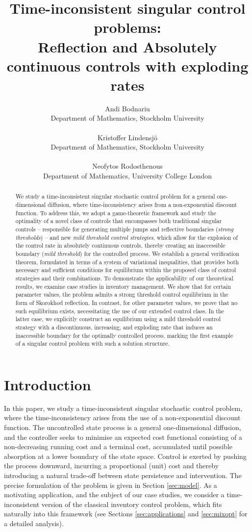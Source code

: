 \documentclass[11pt]{article} %
\title{Time-inconsistent singular control problems: \\ Reflection and Absolutely continuous controls with exploding rates}
\author{
Andi Bodnariu \\Department of Mathematics, Stockholm University\\
\\Kristoffer Lindensjö\\Department of Mathematics, Stockholm University\\
\\Neofytos Rodosthenous\\Department of Mathematics, University College London
}
\numberwithin{komcounter}{section}
\begin{document}
\maketitle

\begin{abstract}
We study a time-inconsistent singular stochastic control problem for a general one-dimensional diffusion, where time-inconsistency arises from a non-exponential discount function. To address this, we adopt a game-theoretic framework and study the optimality of a novel class of controls that encompasses both traditional singular controls -- responsible for generating multiple jumps and reflective boundaries ({\it strong thresholds}) -- and new {\it mild threshold control strategies}, which allow for the explosion of the control rate in absolutely continuous controls, thereby creating an inaccessible boundary ({\it mild threshold}) for the controlled process. 
We establish a general verification theorem, formulated in terms of a system of variational inequalities, that provides both necessary and sufficient conditions for equilibrium within the proposed class of control strategies and their combinations. To demonstrate the applicability of our theoretical results, we examine case studies in inventory management. We show that for certain parameter values, the problem admits a strong threshold control equilibrium in the form of Skorokhod reflection. 
In contrast, for other parameter values, we prove that no such equilibrium exists, necessitating the use of our extended control class.  
In the latter case, we explicitly construct an equilibrium using a mild threshold control strategy with a discontinuous, increasing, and exploding rate that induces an inaccessible boundary for the optimally controlled process, marking the first example of a singular control problem with such a  solution structure.
\end{abstract} 




\section{Introduction} \label{sec:intro}

In this paper, we study a time-inconsistent singular stochastic control problem, where the time-inconsistency arises from the use of a non-exponential discount function.
The uncontrolled state process is a general one-dimensional diffusion, and the controller seeks to minimise an expected cost functional consisting of a non-decreasing running cost and a terminal cost, accumulated until possible absorption at a lower boundary of the state space. Control is exerted by pushing the process downward, incurring a proportional (unit) cost and thereby introducing a natural trade-off between state persistence and intervention.
The precise formulation of the problem is given in Section \ref{sec:model}.
As a motivating application, and the subject of our case studies, we consider a time-inconsistent version of the classical inventory control problem, which fits naturally into this framework (see Sections \ref{sec:applications} and \ref{sec:mixopt} for a detailed analysis).
\end{document}
